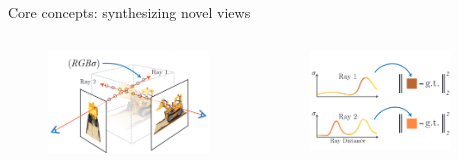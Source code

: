 \documentclass[aspectratio=1610]{beamer}
\begin{document}
\begin{frame}{Core concepts: synthesizing novel views}
    \begin{columns}
        \begin{column}{.3\textwidth}
            \begin{figure}[H]
                \includegraphics[width=\textwidth,keepaspectratio]{density-1}
            \end{figure}
        \end{column}
        \pause
        \begin{column}{.3\textwidth}
            \begin{figure}[H]
                \includegraphics[width=\textwidth,keepaspectratio]{density-2}
            \end{figure}
        \end{column}
        \pause
        \begin{column}{.3\textwidth}

\end{column}
\end{columns}
\end{frame}
\end{document}
